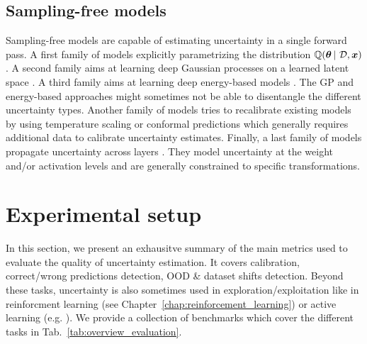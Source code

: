 \subsection{Sampling-free models}
Sampling-free models are capable of estimating uncertainty in a single forward pass. A first family of models explicitly parametrizing the distribution $\operatorname{\mathbb{Q}}(\bm{\theta} \,|\, \operatorname{\mathcal{D}}, \bm{x})$ \citep{survey_evidential_uncertainty,robustness-uncertainty-dirichlet,max_gap_id_ood,uncertainty-generative-classifier,multifaceted_uncertainty,graph-postnet, lightweight-prob-net}. A second family aims at learning deep Gaussian processes on a learned latent space \citep{uncertainty-distance-awareness, due, duq, uceloss}. A third family aims at learning deep energy-based models \citep{ood_ebm, jem_ebm}. The GP and energy-based approaches might sometimes not be able to disentangle the different uncertainty types. Another family of models tries to recalibrate existing models by using temperature scaling \cite{calibration-network} or conformal predictions \cite{conformal-survey} which generally requires additional data to calibrate uncertainty estimates. Finally, a last family of models propagate uncertainty across layers \citep{natural-parameter-network, sampling-free-variance-propagation, feed-forward-propagation, lightweight-prob-net, probabilistic-backprop-scalable-bnn}. They model uncertainty at the weight and/or activation levels and are generally constrained to specific transformations.


\section{Experimental setup}

In this section, we present an exhausitve summary of the main metrics used to evaluate the quality of uncertainty estimation. 
It covers calibration, correct/wrong predictions detection, OOD \& dataset shifts detection.
Beyond these tasks, uncertainty is also sometimes used in exploration/exploitation like in reinforcment learning (see Chapter~\ref{chap:reinforcement_learning}) or active learning (e.g. \cite{gal2017bald, kirsch2019batch}).
We provide a collection of benchmarks which cover the different tasks in Tab.~\ref{tab:overview_evaluation}.

